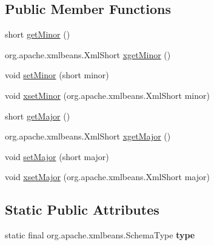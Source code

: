 \subsection*{Public Member Functions}
\begin{DoxyCompactItemize}
\item 
short \hyperlink{interfaceorg_1_1apache_1_1hello_world_soap_http_1_1types_1_1_fault_detail_document_1_1_fault_detail_adf357c092e82a64c21b9eca2a33af890}{get\+Minor} ()
\item 
org.\+apache.\+xmlbeans.\+Xml\+Short \hyperlink{interfaceorg_1_1apache_1_1hello_world_soap_http_1_1types_1_1_fault_detail_document_1_1_fault_detail_a409ccd6ac1071e2a2a25abc90bb826da}{xget\+Minor} ()
\item 
void \hyperlink{interfaceorg_1_1apache_1_1hello_world_soap_http_1_1types_1_1_fault_detail_document_1_1_fault_detail_ae933bf490bf7918b4cd15cf825105d1a}{set\+Minor} (short minor)
\item 
void \hyperlink{interfaceorg_1_1apache_1_1hello_world_soap_http_1_1types_1_1_fault_detail_document_1_1_fault_detail_a16bf829aff450a95e3ef3d39b206eece}{xset\+Minor} (org.\+apache.\+xmlbeans.\+Xml\+Short minor)
\item 
short \hyperlink{interfaceorg_1_1apache_1_1hello_world_soap_http_1_1types_1_1_fault_detail_document_1_1_fault_detail_a02f707c1522ce198bdb2a44d4e094fec}{get\+Major} ()
\item 
org.\+apache.\+xmlbeans.\+Xml\+Short \hyperlink{interfaceorg_1_1apache_1_1hello_world_soap_http_1_1types_1_1_fault_detail_document_1_1_fault_detail_a975947efe0340751a47ef8ce68f40adf}{xget\+Major} ()
\item 
void \hyperlink{interfaceorg_1_1apache_1_1hello_world_soap_http_1_1types_1_1_fault_detail_document_1_1_fault_detail_aac76652627516982c618d1c247fd1c2e}{set\+Major} (short major)
\item 
void \hyperlink{interfaceorg_1_1apache_1_1hello_world_soap_http_1_1types_1_1_fault_detail_document_1_1_fault_detail_a24a722d51a64cc2e065a4c83118534ee}{xset\+Major} (org.\+apache.\+xmlbeans.\+Xml\+Short major)
\end{DoxyCompactItemize}
\subsection*{Static Public Attributes}
\begin{DoxyCompactItemize}
\item 
static final org.\+apache.\+xmlbeans.\+Schema\+Type {\bfseries type}
\end{DoxyCompactItemize}



